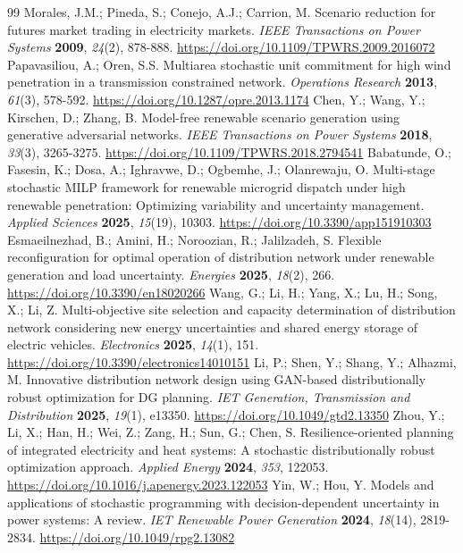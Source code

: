 \documentclass[energies,article,submit,moreauthors]{Definitions/mdpi}
\begin{document}
\begin{thebibliography}{99}
 Morales, J.M.; Pineda, S.; Conejo, A.J.; Carrion, M. Scenario reduction for futures market trading in electricity markets. \emph{IEEE Transactions on Power Systems} \textbf{2009}, \emph{24}(2), 878-888. \url{https://doi.org/10.1109/TPWRS.2009.2016072}
 Papavasiliou, A.; Oren, S.S. Multiarea stochastic unit commitment for high wind penetration in a transmission constrained network. \emph{Operations Research} \textbf{2013}, \emph{61}(3), 578-592. \url{https://doi.org/10.1287/opre.2013.1174}
 Chen, Y.; Wang, Y.; Kirschen, D.; Zhang, B. Model-free renewable scenario generation using generative adversarial networks. \emph{IEEE Transactions on Power Systems} \textbf{2018}, \emph{33}(3), 3265-3275. \url{https://doi.org/10.1109/TPWRS.2018.2794541}
 Babatunde, O.; Fasesin, K.; Dosa, A.; Ighravwe, D.; Ogbemhe, J.; Olanrewaju, O. Multi-stage stochastic MILP framework for renewable microgrid dispatch under high renewable penetration: Optimizing variability and uncertainty management. \emph{Applied Sciences} \textbf{2025}, \emph{15}(19), 10303. \url{https://doi.org/10.3390/app151910303}
 Esmaeilnezhad, B.; Amini, H.; Noroozian, R.; Jalilzadeh, S. Flexible reconfiguration for optimal operation of distribution network under renewable generation and load uncertainty. \emph{Energies} \textbf{2025}, \emph{18}(2), 266. \url{https://doi.org/10.3390/en18020266}
 Wang, G.; Li, H.; Yang, X.; Lu, H.; Song, X.; Li, Z. Multi-objective site selection and capacity determination of distribution network considering new energy uncertainties and shared energy storage of electric vehicles. \emph{Electronics} \textbf{2025}, \emph{14}(1), 151. \url{https://doi.org/10.3390/electronics14010151}
 Li, P.; Shen, Y.; Shang, Y.; Alhazmi, M. Innovative distribution network design using GAN-based distributionally robust optimization for DG planning. \emph{IET Generation, Transmission and Distribution} \textbf{2025}, \emph{19}(1), e13350. \url{https://doi.org/10.1049/gtd2.13350}
 Zhou, Y.; Li, X.; Han, H.; Wei, Z.; Zang, H.; Sun, G.; Chen, S. Resilience-oriented planning of integrated electricity and heat systems: A stochastic distributionally robust optimization approach. \emph{Applied Energy} \textbf{2024}, \emph{353}, 122053. \url{https://doi.org/10.1016/j.apenergy.2023.122053}
 Yin, W.; Hou, Y. Models and applications of stochastic programming with decision-dependent uncertainty in power systems: A review. \emph{IET Renewable Power Generation} \textbf{2024}, \emph{18}(14), 2819-2834. \url{https://doi.org/10.1049/rpg2.13082}

\end{thebibliography}
\end{document}
